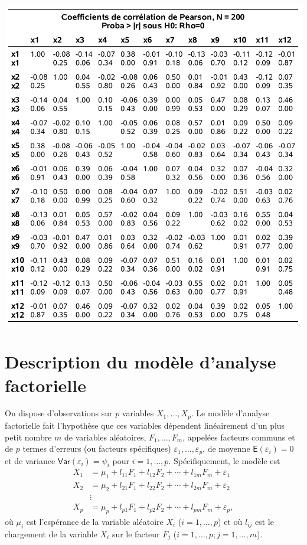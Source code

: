 \documentclass[
]{book}
\theoremstyle{definition}
\theoremstyle{definition}
\theoremstyle{definition}
\theoremstyle{remark}
\begin{document}
\begin{center}\includegraphics[width=0.9\linewidth]{figures/01-facto-e2} \end{center}

\hypertarget{description-du-moduxe8le-danalyse-factorielle}{%
\section{Description du modèle d'analyse factorielle}\label{description-du-moduxe8le-danalyse-factorielle}}

On dispose d'observations sur \(p\) variables \(X_1, \ldots, X_p\). Le modèle d'analyse factorielle fait l'hypothèse que ces variables dépendent linéairement d'un plus petit nombre \(m\) de variables aléatoires, \(F_1, \ldots, F_m\), appelées facteurs communs et de \(p\) termes d'erreurs (ou facteurs spécifiques) \(\varepsilon_1, \ldots, \varepsilon_p\), de moyenne \({\mathsf E}\left(\varepsilon_i\right)=0\) et de variance \({\mathsf{Var}}\left(\varepsilon_i\right)=\psi_i\) pour \(i=1, \ldots, p\). Spécifiquement, le modèle est
\begin{align*}
X_1 &= \mu_1 + l_{11}F_1 + l_{12} F_2 + \cdots + l_{1m}F_m + \varepsilon_1\\
X_2 &= \mu_2 + l_{21}F_1 + l_{22} F_2 + \cdots + l_{2m}F_m + \varepsilon_2\\
&\vdots \\
X_p &= \mu_p + l_{p1}F_1 + l_{p2} F_2 + \cdots + l_{pm}F_m + \varepsilon_p,
\end{align*}
où \(\mu_i\) est l'espérance de la variable aléatoire \(X_i\) (\(i=1, \ldots, p\)) et où \(l_{ij}\) est le chargement de la variable \(X_i\) sur le facteur \(F_j\) (\(i=1,\ldots, p; j=1, \ldots, m\)).
\end{document}
